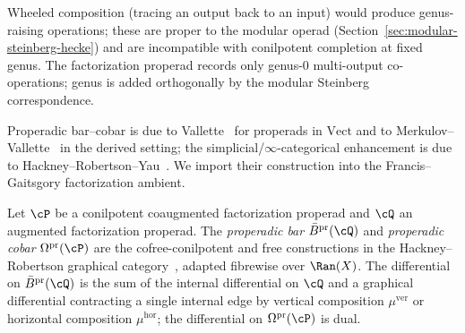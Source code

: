 \begin{remark}\label{rem:non-wheeled}
Wheeled composition (tracing an output back to an input) would
produce genus-raising operations; these are proper to the modular
operad (Section~\ref{sec:modular-steinberg-hecke}) and are
incompatible with conilpotent completion at fixed genus. The
factorization properad records only genus-$0$ multi-output
co-operations; genus is added orthogonally by the modular
Steinberg correspondence.
\end{remark}

Properadic bar--cobar is due to Vallette~\cite{Val07} for properads
in $\mathrm{Vect}$ and to Merkulov--Vallette~\cite{MV09} in the
derived setting; the simplicial/$\infty$-categorical enhancement is
due to Hackney--Robertson--Yau~\cite{HRY20}. We import their
construction into the Francis--Gaitsgory factorization
ambient.

\begin{definition}\label{def:properadic-bar-cobar}
Let $\cP$ be a conilpotent coaugmented factorization properad and
$\cQ$ an augmented factorization properad. The
\emph{properadic bar} $\bar B^{\mathrm{pr}}(\cQ)$ and
\emph{properadic cobar} $\Omega^{\mathrm{pr}}(\cP)$ are the
cofree-conilpotent and free constructions in the Hackney--Robertson
graphical category~\cite{HRY20}, adapted fibrewise over
$\Ran(X)$. The differential on $\bar B^{\mathrm{pr}}(\cQ)$ is the
sum of the internal differential on $\cQ$ and a graphical
differential contracting a single internal edge by vertical
composition $\mu^{\mathrm{ver}}$ or horizontal composition
$\mu^{\mathrm{hor}}$; the differential on $\Omega^{\mathrm{pr}}(\cP)$
is dual.
\end{definition}

